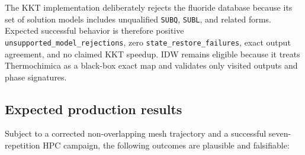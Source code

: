 \documentclass[11pt]{article}
\newcommand{\code}[1]{\texttt{#1}}
\begin{document}
The KKT implementation deliberately rejects the fluoride database because its set of solution
models includes unqualified \code{SUBQ}, \code{SUBL}, and related forms.  Expected successful
behavior is therefore positive \code{unsupported\_model\_rejections}, zero
\code{state\_restore\_failures}, exact output agreement, and no claimed KKT speedup.  IDW remains
eligible because it treats Thermochimica as a black-box exact map and validates only visited
outputs and phase signatures.

\subsection{Expected production results}

Subject to a corrected non-overlapping mesh trajectory and a successful seven-repetition HPC
campaign, the following outcomes are plausible and falsifiable:
\end{document}
